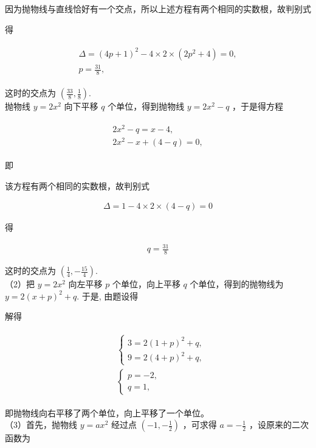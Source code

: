 \documentclass[10pt]{article}
\begin{document}
因为抛物线与直线恰好有一个交点，所以上述方程有两个相同的实数根，故判别式

得

\begin{align*}
\begin{gathered}
\Delta=(4 p+1)^{2}-4 \times 2 \times\left(2 p^{2}+4\right)=0, \\
p=\frac{31}{8},
\end{gathered}
\end{align*}

这时的交点为 $\left(\frac{33}{8}, \frac{1}{8}\right)$.\\
抛物线 $y=2 x^{2}$ 向下平移 $q$ 个单位，得到抛物线 $y=2 x^{2}-q$ ，于是得方程

\begin{align*}
\begin{gathered}
2 x^{2}-q=x-4, \\
2 x^{2}-x+(4-q)=0,
\end{gathered}
\end{align*}

即

该方程有两个相同的实数根，故判别式

\begin{align*}
\Delta=1-4 \times 2 \times(4-q)=0
\end{align*}

得

\begin{align*}
q=\frac{31}{8}
\end{align*}

这时的交点为 $\left(\frac{1}{4},-\frac{15}{4}\right)$.\\
（2）把 $y=2 x^{2}$ 向左平移 $p$ 个单位，向上平移 $q$ 个单位，得到的抛物线为 $y=2(x+p)^{2}+q$. 于是, 由题设得

解得

\begin{align*}
\begin{aligned}
& \left\{\begin{array}{l}
3=2(1+p)^{2}+q, \\
9=2(4+p)^{2}+q,
\end{array}\right. \\
& \left\{\begin{array}{l}
p=-2, \\
q=1,
\end{array}\right.
\end{aligned}
\end{align*}

即抛物线向右平移了两个单位，向上平移了一个单位。\\
（3）首先，抛物线 $y=a x^{2}$ 经过点 $\left(-1,-\frac{1}{2}\right)$ ，可求得 $a=-\frac{1}{2}$ ，设原来的二次函数为
\end{document}
